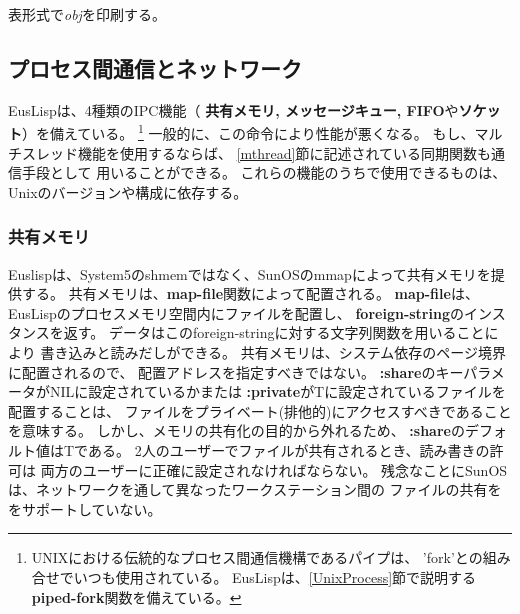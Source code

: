 \begin{refdesc}



{表形式で{\em obj}を印刷する。}



\end{refdesc}

\newpage

\subsection{プロセス間通信とネットワーク\label{IPC}}

EusLispは、4種類のIPC機能（
{\bf 共有メモリ, メッセージキュー, FIFO}や{\bf ソケット}）を備えている。
\footnote{UNIXにおける伝統的なプロセス間通信機構であるパイプは、
'fork'との組み合せでいつも使用されている。
EusLispは、\ref{UnixProcess}節で説明する{\bf piped-fork}関数を備えている。}
一般的に、この命令により性能が悪くなる。
もし、マルチスレッド機能を使用するならば、
\ref{mthread}節に記述されている同期関数も通信手段として
用いることができる。
これらの機能のうちで使用できるものは、Unixのバージョンや構成に依存する。

\subsubsection{共有メモリ}
Euslispは、System5のshmemではなく、SunOSのmmapによって共有メモリを提供する。
共有メモリは、{\bf map-file}関数によって配置される。
{\bf map-file}は、EusLispのプロセスメモリ空間内にファイルを配置し、
{\bf foreign-string}のインスタンスを返す。
データはこのforeign-stringに対する文字列関数を用いることにより
書き込みと読みだしができる。
共有メモリは、システム依存のページ境界に配置されるので、 
配置アドレスを指定すべきではない。
{\bf :share}のキーパラメータがNILに設定されているかまたは
{\bf :private}がTに設定されているファイルを配置することは、
ファイルをプライベート(排他的)にアクセスすべきであることを意味する。
しかし、メモリの共有化の目的から外れるため、
{\bf :share}のデフォルト値はTである。
2人のユーザーでファイルが共有されるとき、読み書きの許可は
両方のユーザーに正確に設定されなければならない。
残念なことにSunOSは、ネットワークを通して異なったワークステーション間の
ファイルの共有ををサポートしていない。

